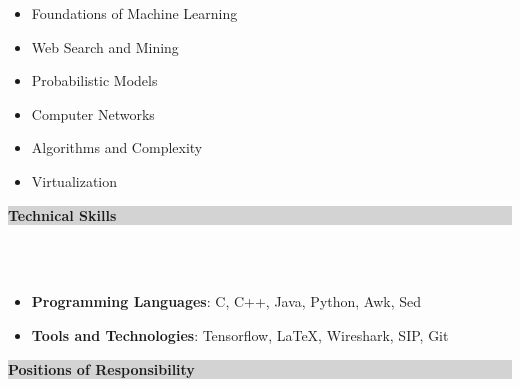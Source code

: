 \documentclass[a4paper,10pt]{article}
\newcommand{\sectsep}{-0.3cm}
\newcommand{\lsep}{-0.5cm}
\newcommand{\hsep}{-0.6cm}
\newcommand{\resheading}[1]{{\small \colorbox{lightgray}{\begin{minipage}{0.975\textwidth}{\textbf{#1 \vphantom{p\^{E}}}}\end{minipage}}}}
\begin{document}
\noindent\begin{minipage}{.35\textwidth}
		\begin{itemize}
			\item Foundations of Machine Learning\\[\hsep]
			\item Web Search and Mining
		\end{itemize}
	\end{minipage} 
    \noindent\begin{minipage}{.30\textwidth}
    \begin{itemize}
			\item Probabilistic Models\\[\hsep]
            \item Computer Networks
		\end{itemize}
     \end{minipage}   
	\noindent\begin{minipage}{.30\textwidth}
		\begin{itemize}
			\item Algorithms and Complexity\\[\hsep]
			\item Virtualization 
		\end{itemize}
	\end{minipage}
    \vspace{0.2cm}




\resheading{\textbf{\large Technical Skills}} \\[\lsep] \\[-0.4cm]
\begin{itemize}
\item \noindent \textbf {Programming Languages}: C, C++, Java, Python, Awk, Sed		\\[\hsep]

\item \noindent \textbf{Tools and Technologies}: Tensorflow, \LaTeX, Wireshark, SIP, Git \\ [\sectsep]
\end{itemize}



\resheading{\textbf{\large Positions of Responsibility}}\\[\lsep] \\[-0.4cm]


\end{document}
